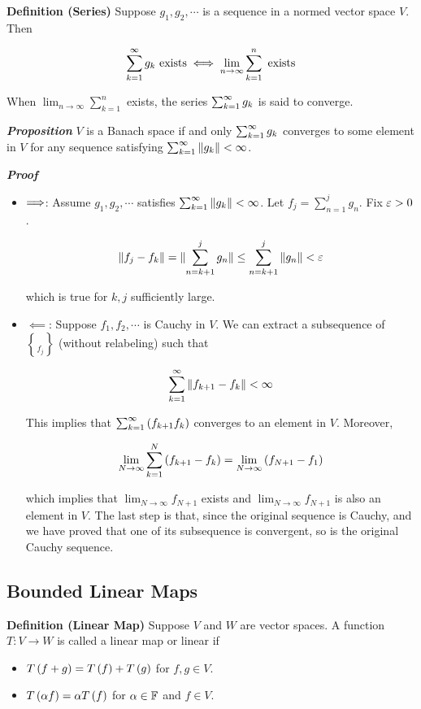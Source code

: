 \documentclass[
]{article}
\begin{document}
\textbf{Definition (Series)} Suppose \(g_1,g_2,\cdots\) is a sequence in
a normed vector space \(V\). Then

\[\sum_{{k} = 1}^{\infty} g_k\text{ exists}\iff \lim_{n\to\infty}\sum_{k = 1}^n\text{ exists}\]

When \(\lim_{n\to\infty}\sum_{k = 1}^n\) exists, the series
\(\sum_{{k} = 1}^{\infty} g_k\) is said to converge.

\emph{\textbf{Proposition}} \(V\) is a Banach space if and only
\(\sum_{{k} = 1}^{\infty} g_k\) converges to some element in \(V\) for any sequence
satisfying \(\sum_{{k} = 1}^{\infty} \|{g_k}\|<\infty\).

\emph{\textbf{Proof}}

\begin{itemize}
\item
  \(\Longrightarrow\): Assume \(g_1,g_2,\cdots\) satisfies
  \(\sum_{{k} = 1}^{\infty} \|{g_k}\|<\infty\). Let \(f_j = \sum_{n = 1}^jg_n\). Fix
  \(\varepsilon>0\).

  \[\|{f_j-f_k}\| = \|{\sum_{n = k+1}^jg_n}\|\le \sum_{n = k+1}^j\|{g_n}\|< \varepsilon\]

  which is true for \(k,j\) sufficiently large.
\item
  \(\impliedby\): Suppose \(f_1,f_2,\cdots\) is Cauchy in \(V\). We can
  extract a subsequence of \(\brace{f_j}\) (without relabeling) such
  that

  \[\sum_{{k} = 1}^{\infty}\|{f_{k+1}-f_k}\|<\infty\]

  This implies that \(\sum_{{k} = 1}^{\infty} \left(f_{k+1}f_k\right)\) converges to an element in
  \(V\). Moreover,

  \[\lim_{N\to\infty}\sum_{k = 1}^N\left(f_{k+1}-f_k\right) = \lim_{N\to\infty}\left(f_{N+1}-f_1\right)\]

  which implies that \(\lim_{N\to\infty}f_{N+1}\) exists and
  \(\lim_{N\to\infty}f_{N+1}\) is also an element in \(V\). The last
  step is that, since the original sequence is Cauchy, and we have
  proved that one of its subsequence is convergent, so is the original
  Cauchy sequence.
\end{itemize}

\hypertarget{bounded-linear-maps}{%
\subsection{Bounded Linear Maps}\label{bounded-linear-maps}}

\textbf{Definition (Linear Map)} Suppose \(V\) and \(W\) are vector
spaces. A function \(T:V\to W\) is called a linear map or linear if

\begin{itemize}
\item
  \(T\left(f+g\right) = T\left(f\right)+T\left(g\right)\) for \(f,g\in V\).
\item
  \(T\left(\alpha f\right) = \alpha T\left(f\right)\) for \(\alpha\in \mathbb F\) and
  \(f\in V\).
\end{itemize}
\end{document}
